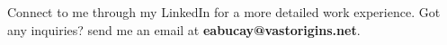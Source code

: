 
\begin{cvinterests}
    {Connect to me through my LinkedIn for a more detailed work experience. Got any inquiries? send me an email at \textbf{eabucay@vastorigins.net}.}
\end{cvinterests}